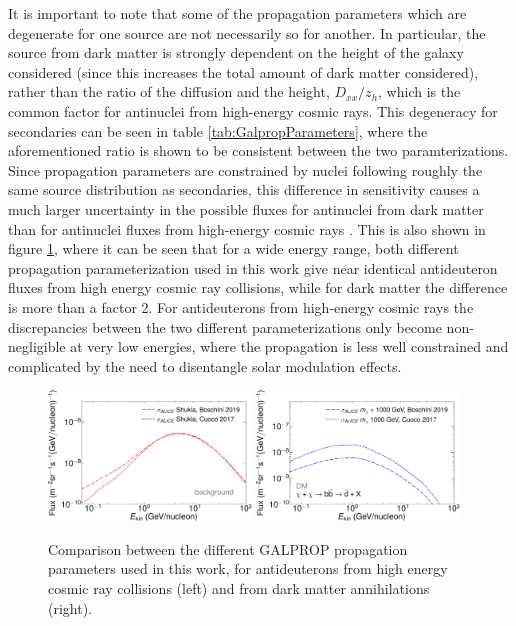 It is important to note that some of the propagation parameters which are degenerate for one source are not necessarily so for another. In particular, the source from dark matter is strongly dependent on the height of the galaxy considered (since this increases the total amount of dark matter considered), rather than the ratio of the diffusion and the height, $D_{xx}/z_h$, which is the common factor for antinuclei from high-energy cosmic rays. This degeneracy for secondaries can be seen in table \ref{tab:GalpropParameters}, where the aforementioned  ratio is shown to be consistent between the two paramterizations. Since propagation parameters are constrained by nuclei following roughly the same source distribution as secondaries, this difference in sensitivity causes a much larger uncertainty in the possible fluxes for antinuclei from dark matter than for antinuclei fluxes from high-energy cosmic rays \cite{Serksnyte:2022onw}. This is also shown in figure \ref{fig:ComparisonPropagation}, where it can be seen that for a wide energy range, both different propagation parameterization used in this work give near identical antideuteron fluxes from high energy cosmic ray collisions, while for dark matter the difference is more than a factor 2. For antideuterons from high-energy cosmic rays the discrepancies between the two different parameterizations only become non-negligible at very low energies, where the propagation is less well constrained and complicated by the need to disentangle solar modulation effects. 

\begin{figure}
    \centering
    \includegraphics[width=0.48\textwidth]{figures/ComparisonPropagationBoschini.pdf}
    \includegraphics[width=0.48\textwidth]{figures/ComparisonPropagationBoschiniDM.pdf}
    \caption{Comparison between the different GALPROP propagation parameters used in this work, for antideuterons from high energy cosmic ray collisions (left) and from dark matter annihilations (right).}
    \label{fig:ComparisonPropagation}
\end{figure}

